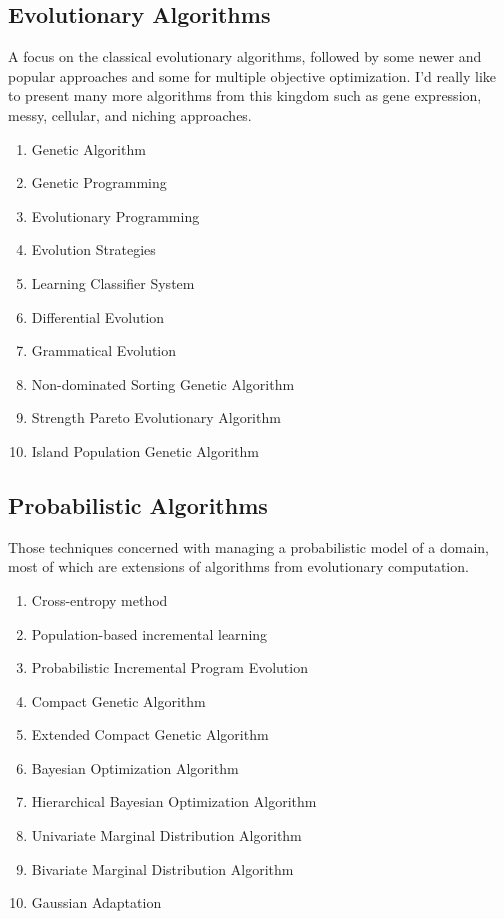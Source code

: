 \documentclass[a4paper, 11pt]{article}
\begin{document}
\subsection{Evolutionary Algorithms}
A focus on the classical evolutionary algorithms, followed by some newer and popular approaches and some for multiple objective optimization. I'd really like to present many more algorithms from this kingdom such as gene expression, messy, cellular, and niching approaches. 

\begin{enumerate}
	\item Genetic Algorithm
	\item Genetic Programming
	\item Evolutionary Programming
	\item Evolution Strategies
	\item Learning Classifier System
	\item Differential Evolution
	\item Grammatical Evolution
	\item Non-dominated Sorting Genetic Algorithm
	\item Strength Pareto Evolutionary Algorithm
	\item Island Population Genetic Algorithm
\end{enumerate}

\subsection{Probabilistic Algorithms}
Those techniques concerned with managing a probabilistic model of a domain, most of which are extensions of algorithms from evolutionary computation.

\begin{enumerate}
	\item Cross-entropy method
	\item Population-based incremental learning
	\item Probabilistic Incremental Program Evolution
	\item Compact Genetic Algorithm
	\item Extended Compact Genetic Algorithm
	\item Bayesian Optimization Algorithm
	\item Hierarchical Bayesian Optimization Algorithm
	\item Univariate Marginal Distribution Algorithm
	\item Bivariate Marginal Distribution Algorithm
	\item Gaussian Adaptation
\end{enumerate}
\end{document}
